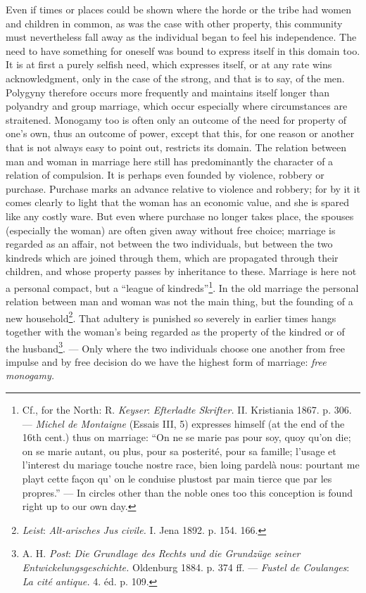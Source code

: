 \documentclass[12pt,a4paper,openany]{book}
\newcommand{\opage}[1]{\marginnote{\footnotesize\textit{[#1]}}}
\begin{document}
Even if times or places could be shown where the horde or the tribe had women and children in common, as was the case
with other property, this community must nevertheless fall away as the individual began to feel his independence. The
need to have something for oneself was bound to express itself in this domain too. It is at first a purely selfish
need, which expresses itself, or at any rate wins acknowledgment, only in the case of the strong, and that is to say,
of the men. Polygyny therefore occurs more frequently and maintains itself longer than polyandry and group marriage,
which occur especially where circumstances are straitened. Monogamy too is often only an outcome of the need for
property of one's own, thus an outcome of power, except that this, for one reason or another that is not always easy to
point out, restricts its domain. The relation between man and woman in marriage here still has predominantly the
character of a relation of compulsion. It is perhaps even founded by violence, robbery or purchase. Purchase marks an
advance relative to violence and robbery; for by it it comes clearly to light that the woman has an economic value, and
she is spared like any costly ware. But even where purchase no longer takes place, the spouses (especially the woman)
are often given away without free choice; marriage is regarded as an affair, not between the two individuals, but
between the two kindreds which are joined through them, which are propagated through their children, and whose property
passes by inheritance to these. Marriage is here not a personal compact, but a ``league of
kindreds''\footnote[1]{Cf., for the North: R. \emph{Keyser}: \textit{Efterladte Skrifter.} II. Kristiania 1867. p. 306.
--- \emph{Michel de Montaigne} (Essais III, 5) expresses himself (at the end of the 16th cent.) thus on marriage: ``On
ne se marie pas pour soy, quoy qu'on die; on se marie autant, ou plus, pour sa posterité, pour sa famille; l'usage et
l'interest du mariage touche nostre race, bien loing pardelà nous: pourtant me playt cette façon qu' on le conduise
plustost par main tierce que par les propres.'' --- In circles other than the noble ones too this conception is found
right up to our own day.}. In the old marriage the personal
\opage{284}relation between man and woman was not the main thing, but the founding of a new
household\footnote[1]{\emph{Leist}: \textit{Alt-arisches Jus civile.} I. Jena 1892. p. 154. 166.}. That adultery is
punished so severely in earlier times hangs together with the woman's being regarded as the property of the kindred or
of the husband\footnote[2]{A. H. \emph{Post}: \textit{Die Grundlage des Rechts und die Grundzüge seiner
Entwickelungsgeschichte.} Oldenburg 1884. p. 374 ff. --- \emph{Fustel de Coulanges}: \textit{La cité antique.} 4. éd.
p. 109.}. --- Only where the two individuals choose one another from free impulse and by free decision do we have the
highest form of marriage: \textit{free monogamy.}
\end{document}
